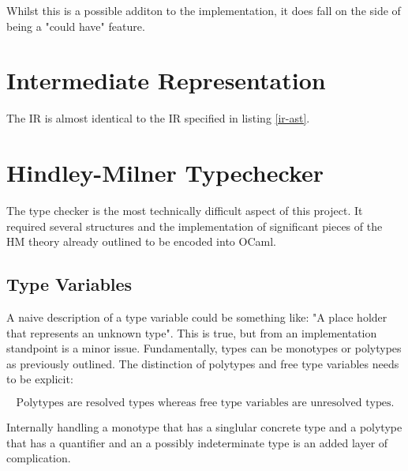 \documentclass{l4proj}
\begin{document}
Whilst this is a possible additon to the implementation, it does fall on the side of being a "could have" feature.

\section{Intermediate Representation}

The IR is almost identical to the IR specified in listing \ref{ir-ast}.

\section{Hindley-Milner Typechecker} \label{sec:hindley-milner-typechecker}

The type checker is the most technically difficult aspect of this project.
It required several structures and the implementation of significant pieces of the HM theory already outlined to be encoded into OCaml.

\subsection{Type Variables}

A naive description of a type variable could be something like: "A place holder that represents an unknown type".
This is true, but from an implementation standpoint is a minor issue.
Fundamentally, types can be monotypes or polytypes as previously outlined.
The distinction of polytypes and free type variables needs to be explicit:

\[\text{Polytypes are resolved types whereas free type variables are unresolved types.}\]



Internally handling a monotype that has a singlular concrete type and a polytype that has a quantifier and an a possibly indeterminate type is an added layer of complication.
\end{document}
